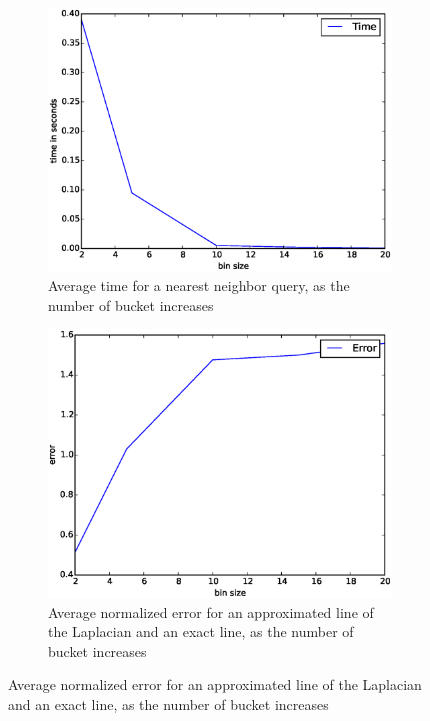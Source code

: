 \documentclass{article} %
\begin{document}
\begin{figure}[!ht]
 \begin{subfigure}{0.43\textwidth}
   \includegraphics[width=\textwidth]{figures/time_binsize.eps}
   \caption{Average time for a nearest neighbor query, as the number of bucket increases}
 \end{subfigure}\hfill
 \begin{subfigure}{0.43\textwidth}
   \includegraphics[width=\textwidth]{figures/error_binsize.eps}
   \caption{Average normalized error for an approximated line of the Laplacian and an exact line, as the number of bucket increases}
 \end{subfigure}\hfill

\end{figure}
\end{document}
